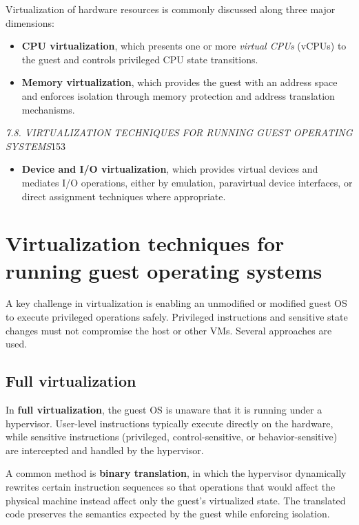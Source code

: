 \documentclass[11pt,a4paper,openany]{report}
\begin{document}
Virtualization of hardware resources is commonly discussed along three major dimensions:

\begin{itemize}
\item \textbf{CPU virtualization}, which presents one or more \emph{virtual CPUs} (vCPUs) to the guest and controls privileged CPU state transitions.
\item \textbf{Memory virtualization}, which provides the guest with an address space and enforces isolation through memory protection and address translation mechanisms.
\end{itemize}

\emph{7.8. VIRTUALIZATION TECHNIQUES FOR RUNNING GUEST OPERATING SYSTEMS}153

\begin{itemize}
\item \textbf{Device and I/O virtualization}, which provides virtual devices and mediates I/O operations, either by emulation, paravirtual device interfaces, or direct assignment techniques where appropriate.
\end{itemize}

\section{Virtualization techniques for running guest operating systems}

A key challenge in virtualization is enabling an unmodified or modified guest OS to execute privileged operations safely. Privileged instructions and sensitive state changes must not compromise the host or other VMs. Several approaches are used.

\subsection{Full virtualization}

In \textbf{full virtualization}, the guest OS is unaware that it is running under a hypervisor. User-level instructions typically execute directly on the hardware, while sensitive instructions (privileged, control-sensitive, or behavior-sensitive) are intercepted and handled by the hypervisor.

A common method is \textbf{binary translation}, in which the hypervisor dynamically rewrites certain instruction sequences so that operations that would affect the physical machine instead affect only the guest's virtualized state. The translated code preserves the semantics expected by the guest while enforcing isolation.
\end{document}
